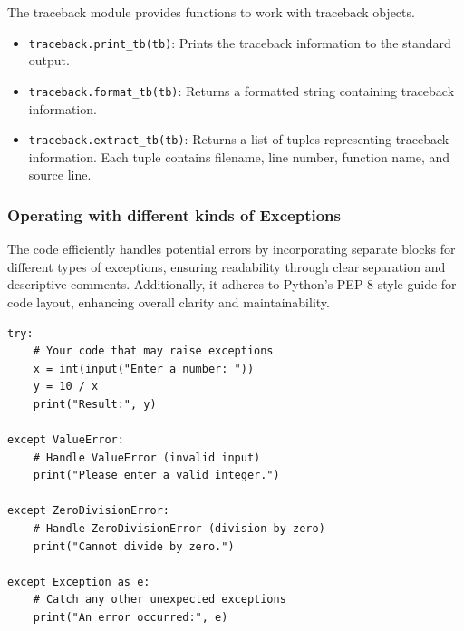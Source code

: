 The traceback module provides functions to work with traceback objects.

\begin{itemize}
    \item \texttt{traceback.print\_tb(tb)}: Prints the traceback information to the standard output.
    \item \texttt{traceback.format\_tb(tb)}: Returns a formatted string containing traceback information.
    \item \texttt{traceback.extract\_tb(tb)}: Returns a list of tuples representing traceback information. Each tuple contains filename, line number, function name, and source line.
\end{itemize}

\subsubsection{Operating with different kinds of Exceptions}
The code efficiently handles potential errors by incorporating separate blocks for different types of exceptions, ensuring readability through clear separation and descriptive comments. Additionally, it adheres to Python's PEP 8 style guide for code layout, enhancing overall clarity and maintainability.
\begin{codebox}
\begin{verbatim}
try:
    # Your code that may raise exceptions
    x = int(input("Enter a number: "))
    y = 10 / x
    print("Result:", y)

except ValueError:
    # Handle ValueError (invalid input)
    print("Please enter a valid integer.")

except ZeroDivisionError:
    # Handle ZeroDivisionError (division by zero)
    print("Cannot divide by zero.")

except Exception as e:
    # Catch any other unexpected exceptions
    print("An error occurred:", e)
\end{verbatim}
\end{codebox}






